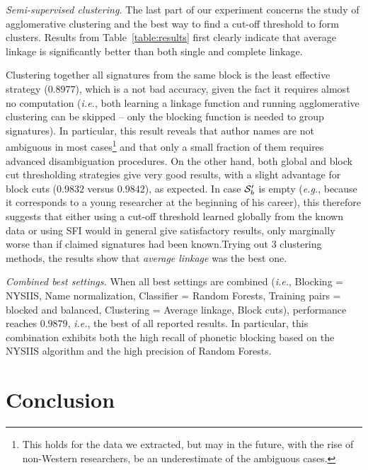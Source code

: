 \documentclass[conference]{IEEEtran}
\newcommand{\ie}{\emph{i.e.}\xspace}
\newcommand{\eg}{\emph{e.g.}\xspace}
\begin{document}
\textit{Semi-supervised clustering.} The last part of our experiment concerns
the study of agglomerative clustering and the best way to find a cut-off
threshold to form clusters. Results from Table~\ref{table:results}
first clearly indicate that average linkage is significantly better than
both single and complete linkage.

Clustering together all signatures from the same block is the least effective
strategy ($0.8977$), which is a not bad accuracy, given the
fact it requires almost no computation (\ie, both learning a linkage function
and running agglomerative clustering can be skipped -- only the blocking
function is needed to group signatures). In particular, this result reveals
that author names are not ambiguous in most cases\footnote{This holds for the
data we extracted, but may in the future, with the rise of non-Western
researchers, be an underestimate of the ambiguous cases.} and that only a small
fraction of them requires advanced disambiguation procedures. On the other
hand, both global and block cut thresholding strategies give very good results,
with a slight advantage for block cuts ($0.9832$ versus $0.9842$), as expected.
In case ${\cal S}^\prime_b$ is empty (\eg, because it corresponds to a young
researcher at the beginning of his career), this therefore suggests that either using
a cut-off threshold learned globally from the known data or using SFI would in general give
satisfactory results, only marginally worse than if claimed signatures had been
known.Trying out 3 clustering methods, the results show that \textit {average linkage} was the best one.

\textit{Combined best settings.} When all best settings are combined (\ie,
Blocking = NYSIIS, Name normalization, Classifier = Random Forests, Training
pairs = blocked and balanced, Clustering = Average linkage, Block cuts),
performance reaches $0.9879$, \ie, the best of all reported results. In particular,
this combination exhibits both the high recall of phonetic blocking based on the NYSIIS algorithm
and the high precision of Random Forests.


\section{Conclusion}
\label{conclusions}
\end{document}
